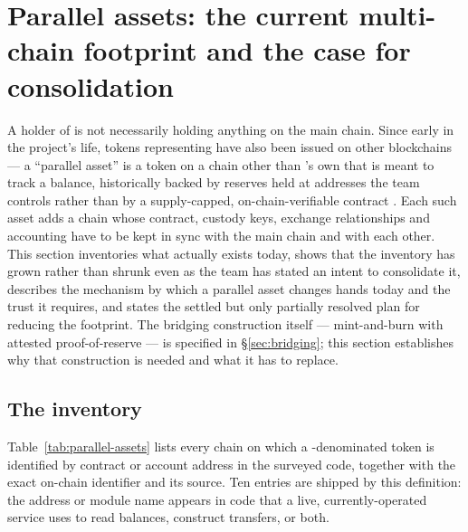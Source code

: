 \section{Parallel assets: the current multi-chain footprint and the case for consolidation}
\label{sec:parallel-assets}

A holder of \Flux is not necessarily holding anything on the \Flux main chain. Since early in the
project's life, tokens representing \flux have also been issued on other blockchains — a
``parallel asset'' is a token on a chain other than \Flux's own that is meant to track a \flux
balance, historically backed by reserves held at addresses the team controls rather than by a
supply-capped, on-chain-verifiable contract . Each such asset
adds a chain whose contract, custody keys, exchange relationships and accounting have to be kept in
sync with the main chain and with each other. This section inventories what actually exists today,
shows that the inventory has grown rather than shrunk even as the team has stated an intent to
consolidate it, describes the mechanism by which a parallel asset changes hands today and the trust
it requires, and states the settled but only partially resolved plan for reducing the footprint.
The bridging construction itself — mint-and-burn with attested proof-of-reserve — is specified in
\S\ref{sec:bridging}; this section establishes why that construction is needed and what it has to
replace.

\subsection{The inventory}
\label{sec:pa-inventory}

Table~\ref{tab:parallel-assets} lists every chain on which a \flux-denominated token is identified
by contract or account address in the surveyed code, together with the exact on-chain identifier
and its source. Ten entries are shipped by this definition: the address or module name appears in
code that a live, currently-operated service uses to read balances, construct transfers, or both.

